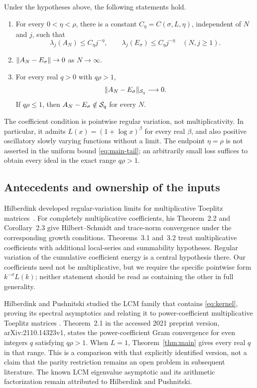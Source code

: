 \begin{theorem}
\label{thm:main}
Under the hypotheses above, the following statements hold.
\begin{enumerate}
\item For every $0<\eta<\rho$, there is a constant
$C_\eta=C(\sigma,L,\eta)$, independent of $N$ and $j$, such that
\begin{equation}
 \lambda_j(A_N)\le C_\eta j^{-\eta},\qquad
 \lambda_j(E_\sigma)\le C_\eta j^{-\eta}
 \quad(N,j\ge1).
 \label{eq:main-tail}
\end{equation}
\item $\lVert A_N-E_\sigma\rVert\to0$ as $N\to\infty$.
\item For every real $q>0$ with $q\rho>1$,
\begin{equation}
 \lVert A_N-E_\sigma\rVert_{\mathcal S_q}\longrightarrow0.
 \label{eq:main-ideal}
\end{equation}
If $q\rho\le1$, then $A_N-E_\sigma\notin\mathcal S_q$ for every $N$.
\end{enumerate}
\end{theorem}

The coefficient condition is pointwise regular variation, not
multiplicativity. In particular, it admits
$L(x)=(1+\log x)^\beta$ for every real $\beta$, and also positive
oscillatory slowly varying functions without a limit. The endpoint
$\eta=\rho$ is not asserted in the uniform bound
\eqref{eq:main-tail}; an arbitrarily small loss suffices to obtain every
ideal in the exact range $q\rho>1$.

\subsection{Antecedents and ownership of the inputs}

Hilberdink developed regular-variation limits for multiplicative
Toeplitz matrices~\cite{Hilberdink2017}. For completely multiplicative
coefficients, his Theorem~2.2 and Corollary~2.3 give Hilbert--Schmidt and
trace-norm convergence under the corresponding growth conditions.
Theorems~3.1 and~3.2 treat multiplicative coefficients with additional
local-series and summability hypotheses. Regular variation of the
cumulative coefficient energy is a central hypothesis there. Our
coefficients need not be multiplicative, but we require the specific
pointwise form $k^{-\sigma}L(k)$; neither statement should be read as
containing the other in full generality.

Hilberdink and Pushnitski studied the LCM family that contains
\eqref{eq:kernel}, proving its spectral asymptotics and relating it to
power-coefficient multiplicative Toeplitz matrices
\cite{HilberdinkPushnitski2023}. Theorem~2.1 in the accessed
2021 preprint version, arXiv:2110.14323v1, states the power-coefficient
Gram convergence for even integers $q$ satisfying $q\rho>1$.
When $L=1$, Theorem~\ref{thm:main} gives every real $q$ in that range.
This is a comparison with that explicitly identified version, not a
claim that the parity restriction remains an open problem in subsequent
literature. The known LCM eigenvalue asymptotic and its arithmetic
factorization remain attributed to Hilberdink and Pushnitski.

